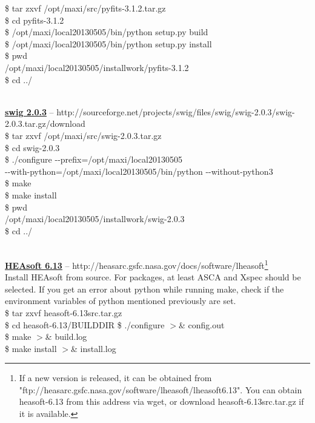 \documentclass[10pt]{report}
\renewcommand{\_}{\textscale{.5}{\textbf{\textunderscore}}}
\begin{document}
\noindent \$ tar zxvf /opt/maxi/src/pyfits-3.1.2.tar.gz\\
\$ cd pyfits-3.1.2\\
\$ /opt/maxi/local\_20130505/bin/python setup.py build\\
\$ /opt/maxi/local\_20130505/bin/python setup.py install\\
\$ pwd\\
\phantom{\$ }/opt/maxi/local\_20130505/install\_work/pyfits-3.1.2\\
\$ cd ../\\

\

\noindent\underline{\textbf{swig 2.0.3}} -- http://sourceforge.net/projects/swig/files/swig/swig-2.0.3/swig-2.0.3.tar.gz/download\\

\noindent \$ tar zxvf /opt/maxi/src/swig-2.0.3.tar.gz\\
\$ cd swig-2.0.3\\
\$ ./configure -{}-prefix=/opt/maxi/local\_20130505\\
\phantom{\$ }-{}-with-python=/opt/maxi/local\_20130505/bin/python -{}-without-python3\\
\$ make\\
\$ make install\\
\$ pwd\\
\phantom{\$ }/opt/maxi/local\_20130505/install\_work/swig-2.0.3\\
\$ cd ../\\

\

\noindent\underline{\textbf{HEAsoft 6.13}} -- http://heasarc.gsfc.nasa.gov/docs/software/lheasoft\footnote{If a new version is released, it can be obtained from "ftp://heasarc.gsfc.nasa.gov/software/lheasoft/lheasoft6.13". You can obtain heasoft-6.13 from this address via wget, or download heasoft-6.13src.tar.gz if it is available.}\\

\noindent Install HEAsoft from source. For packages, at least ASCA and Xspec should be selected. If you get an error about python while running make, check if the environment variables of python mentioned previously are set. \\

\noindent \$ tar zxvf heasoft-6.13src.tar.gz\\
\$ cd heasoft-6.13/BUILD\_DIR \$ ./configure $>$\& config.out\\
\$ make $>$\& build.log\\
\$ make install $>$\& install.log \\
\end{document}
